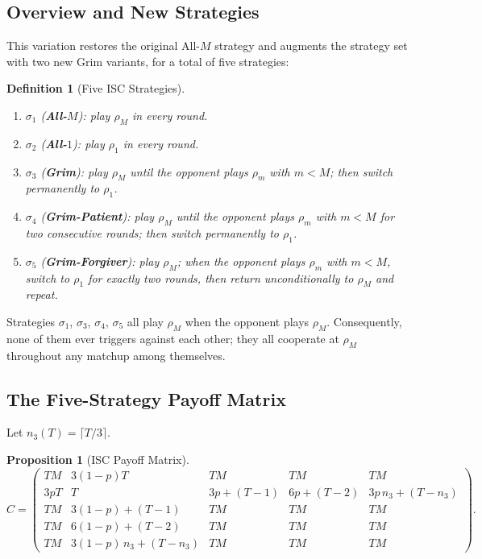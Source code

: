 \documentclass[12pt,a4paper]{article}
\newtheorem{definition}{Definition}[section]
\newtheorem{proposition}{Proposition}[section]
\begin{document}
\subsection{Overview and New Strategies}

This variation restores the original All-$M$ strategy and augments the strategy
set with two new Grim variants, for a total of five strategies:

\begin{definition}[Five ISC Strategies]\label{def:v3_strats}
\hfill
\begin{enumerate}
  \item $\sigma_1$ (\textbf{All-$M$}): play $\rho_M$ in every round.
  \item $\sigma_2$ (\textbf{All-$1$}): play $\rho_1$ in every round.
  \item $\sigma_3$ (\textbf{Grim}): play $\rho_M$ until the opponent plays
        $\rho_m$ with $m<M$; then switch permanently to $\rho_1$.
  \item $\sigma_4$ (\textbf{Grim-Patient}): play $\rho_M$ until the opponent
        plays $\rho_m$ with $m<M$ for \emph{two consecutive rounds}; then
        switch permanently to $\rho_1$.
  \item $\sigma_5$ (\textbf{Grim-Forgiver}): play $\rho_M$; when the opponent
        plays $\rho_m$ with $m<M$, switch to $\rho_1$ for \emph{exactly two
        rounds}, then return unconditionally to $\rho_M$ and repeat.
\end{enumerate}
\end{definition}

Strategies $\sigma_1$, $\sigma_3$, $\sigma_4$, $\sigma_5$ all play $\rho_M$
when the opponent plays $\rho_M$. Consequently, none of them ever triggers
against each other; they all cooperate at $\rho_M$ throughout any matchup among
themselves.

\subsection{The Five-Strategy Payoff Matrix}

Let $n_3(T) = \lceil T/3 \rceil$.

\begin{proposition}[ISC Payoff Matrix]\label{prop:v3_Cmatrix}
\begin{equation}\label{eq:v3_C}
C = \begin{pmatrix}
T M & 3(1-p)T & TM & TM & TM \\[4pt]
3pT & T & 3p + (T-1) & 6p + (T-2) & 3p\,n_3 + (T-n_3) \\[4pt]
TM & 3(1-p)+(T-1) & TM & TM & TM \\[4pt]
TM & 6(1-p)+(T-2) & TM & TM & TM \\[4pt]
TM & 3(1-p)\,n_3+(T-n_3) & TM & TM & TM
\end{pmatrix}.
\end{equation}
\end{proposition}
\end{document}
